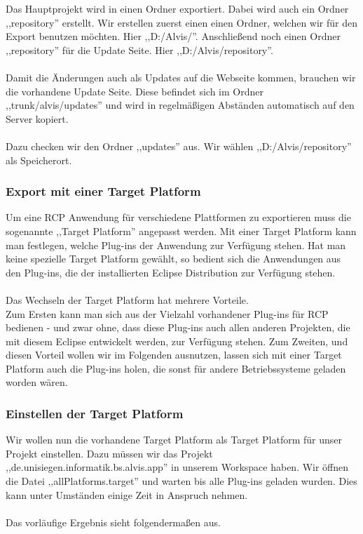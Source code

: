 \documentclass[10pt,a4paper]{article}
\begin{document}
Das Hauptprojekt wird in einen Ordner exportiert. Dabei wird auch ein Ordner ,,repository'' erstellt. Wir erstellen zuerst einen einen Ordner, welchen wir für den Export benutzen möchten. Hier ,,D:/Alvis/''. Anschließend noch einen Ordner ,,repository'' für die Update Seite. Hier ,,D:/Alvis/repository''.
\\ \\
Damit die Änderungen auch als Updates auf die Webseite kommen, brauchen wir die vorhandene Update Seite. Diese befindet sich im Ordner ,,trunk/alvis/updates'' und wird in regelmäßigen Abständen automatisch auf den Server kopiert. 
\\ \\
Dazu checken wir den Ordner ,,updates'' aus. Wir wählen ,,D:/Alvis/repository'' als Speicherort.
\subsubsection{Export mit einer Target Platform}
Um eine RCP Anwendung für verschiedene Plattformen zu exportieren muss die sogenannte ,,Target Platform'' angepasst werden. Mit einer Target Platform kann man festlegen, welche Plug-ins der Anwendung zur Verfügung stehen. Hat man keine spezielle Target Platform gewählt, so bedient sich die Anwendungen aus den Plug-ins, die der installierten Eclipse Distribution zur Verfügung stehen.
\\
\\
Das Wechseln der Target Platform hat mehrere Vorteile. \\
Zum Ersten kann man sich aus der Vielzahl vorhandener Plug-ins für RCP bedienen - und zwar ohne, dass diese Plug-ins auch allen anderen Projekten, die mit diesem Eclipse entwickelt werden, zur Verfügung stehen.
Zum Zweiten, und diesen Vorteil wollen wir im Folgenden ausnutzen, lassen sich mit einer Target Platform auch die Plug-ins holen, die sonst für andere Betriebssysteme geladen worden wären.

\subsubsection{Einstellen der Target Platform}
Wir wollen nun die vorhandene Target Platform als Target Platform für unser Projekt einstellen. Dazu müssen wir das Projekt\\
,,de.unisiegen.informatik.bs.alvis.app'' in unserem Workspace haben. Wir öffnen die Datei ,,allPlatforms.target'' und warten bis alle Plug-ins geladen wurden. Dies kann unter Umständen einige Zeit in Anspruch nehmen. 
\\ \\
Das vorläufige Ergebnis sieht folgendermaßen aus.
\begin{center}
\end{center}
\end{document}
